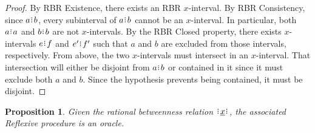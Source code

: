 \documentclass[12pt]{article}
\newtheorem{proposition}{Proposition}[section]
\begin{document}
\begin{proof}
    By RBR Existence, there exists an RBR $x$-interval. By RBR Consistency,  since \sout{$a\rint b$}, every subinterval of $a \rint b$ cannot be an $x$-interval. In particular, both $a\rint a$ and $b\rint b$ are not $x$-intervals. By the RBR Closed property, there exists $x$-intervals $e\rint f$ and $e'\rint f'$ such that $a$ and $b$ are excluded from those intervals, respectively. From above, the two $x$-intervals must intersect in an $x$-interval. That intersection will either be disjoint from $a\rint b$ or contained in it since it must exclude both $a$ and $b$. Since the hypothesis prevents being contained, it must be disjoint. 
\end{proof}

\begin{proposition}
    Given the rational betweenness relation $\xrel$, the associated Reflexive procedure is an oracle. 
\end{proposition}
\end{document}
